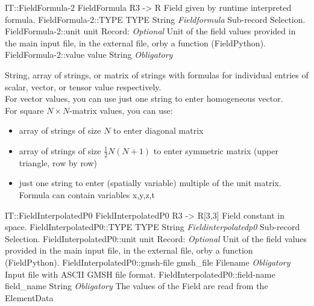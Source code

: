 \begin{RecordType}
	{IT::FieldFormula-2}
	{FieldFormula}
	{} %
	{} %
	{{{R3 -{\textgreater} R Field given by runtime interpreted formula.}}}
		\RecKey
			{FieldFormula-2::TYPE}
			{TYPE}
			{{String}}
			{ \it{Fieldformula} }
			{{{Sub-record Selection.}}}
		\RecKey
			{FieldFormula-2::unit}
			{unit}
			{{Record}{: }}
			{ \it{Optional} }
			{{{Unit of the field values provided in the main input file, in the external file, orby a function (FieldPython).}}}
		\RecKey
			{FieldFormula-2::value}
			{value}
			{{String}}
			{ \it{Obligatory} }
			{{{{String, array of strings, or matrix of strings with formulas for individual entries of scalar, vector, or tensor value respectively.}\\{
For vector values, you can use just one string to enter homogeneous vector.}\\{
For square }{$N\times N$}{-matrix values, you can use:}
}
\begin{itemize}
\item {array of strings of size }{$N$}{ to enter diagonal matrix}
\item {array of strings of size }{$\frac12N(N+1)$}{ to enter symmetric matrix (upper triangle, row by row)}
\item {just one string to enter (spatially variable) multiple of the unit matrix.}\\{
Formula can contain variables }\ttfamily x,y,z,t
\end{itemize}
}}
\end{RecordType}
\begin{RecordType}
	{IT::FieldInterpolatedP0}
	{FieldInterpolatedP0}
	{} %
	{} %
	{{{R3 -{\textgreater} R[3,3] Field constant in space.}}}
		\RecKey
			{FieldInterpolatedP0::TYPE}
			{TYPE}
			{{String}}
			{ \it{Fieldinterpolatedp0} }
			{{{Sub-record Selection.}}}
		\RecKey
			{FieldInterpolatedP0::unit}
			{unit}
			{{Record}{: }}
			{ \it{Optional} }
			{{{Unit of the field values provided in the main input file, in the external file, orby a function (FieldPython).}}}
		\RecKey
			{FieldInterpolatedP0::gmsh-file}
			{gmsh{\_}file}
			{{Filename}}
			{ \it{Obligatory} }
			{{{Input file with ASCII GMSH file format.}}}
		\RecKey
			{FieldInterpolatedP0::field-name}
			{field{\_}name}
			{{String}}
			{ \it{Obligatory} }
			{{{The values of the Field are read from the }\ttfamily {\$}ElementData}}
\end{RecordType}
